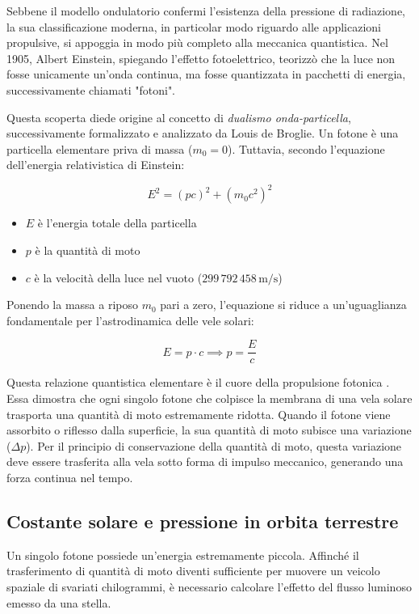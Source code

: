 Sebbene il modello ondulatorio confermi l'esistenza della pressione di radiazione, la sua classificazione moderna, in particolar modo riguardo alle applicazioni propulsive, si appoggia in modo più completo alla meccanica quantistica. Nel 1905, Albert Einstein, spiegando l'effetto fotoelettrico, teorizzò che la luce non fosse unicamente un'onda continua, ma fosse quantizzata in pacchetti di energia, successivamente chiamati "fotoni".

Questa scoperta diede origine al concetto di \textit{dualismo onda-particella}, successivamente formalizzato e analizzato da Louis de Broglie. Un fotone è una particella elementare priva di massa ($m_0 = 0$). Tuttavia, secondo l'equazione dell'energia relativistica di Einstein:

\begin{equation}
    E^2 = (pc)^2 + (m_0 c^2)^2
\end{equation}

\begin{itemize}
    \item $E$ è l'energia totale della particella
    \item $p$ è la quantità di moto
    \item $c$ è la velocità della luce nel vuoto ($299\,792\,458 \, \text{m/s}$)
\end{itemize}

Ponendo la massa a riposo $m_0$ pari a zero, l'equazione si riduce a un'uguaglianza fondamentale per l'astrodinamica delle vele solari:

\begin{equation} \label{eq:quantita_moto_fotone}
    E = p \cdot c \implies p = \frac{E}{c}
\end{equation}

Questa relazione quantistica elementare è il cuore della propulsione fotonica \cite{mcinnes1999solar}. Essa dimostra che ogni singolo fotone che colpisce la membrana di una vela solare trasporta una quantità di moto estremamente ridotta. Quando il fotone viene assorbito o riflesso dalla superficie, la sua quantità di moto subisce una variazione ($\Delta p$). Per il principio di conservazione della quantità di moto, questa variazione deve essere trasferita alla vela sotto forma di impulso meccanico, generando una forza continua nel tempo.


\subsection{Costante solare e pressione in orbita terrestre}
Un singolo fotone possiede un'energia estremamente piccola. Affinché il trasferimento di quantità di moto diventi sufficiente per muovere un veicolo spaziale di svariati chilogrammi, è necessario calcolare l'effetto del flusso luminoso emesso da una stella.

